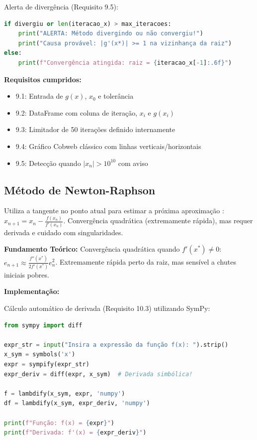 \documentclass[
	12pt,				%
	openright,			%
	oneside,			%
	a4paper,			%
	english,			%
	brazil				%
	]{abntex2}
\begin{document}
Alerta de divergência (Requisito 9.5):

\begin{lstlisting}[language=Python, caption={Requisito 9.5 - Alerta de Divergência}]
if divergiu or len(iteracao_x) > max_iteracoes:
    print("ALERTA: Método divergindo ou não convergiu!")
    print("Causa provável: |g'(x*)| >= 1 na vizinhança da raiz")
else:
    print(f"Convergência atingida: raiz = {iteracao_x[-1]:.6f}")
\end{lstlisting}

\vspace{0.3cm}

\textbf{Requisitos cumpridos:}
\begin{itemize}
    \item[✓] 9.1: Entrada de $g(x)$, $x_0$ e tolerância
    \item[✓] 9.2: DataFrame com coluna de iteração, $x_i$ e $g(x_i)$
    \item[✓] 9.3: Limitador de 50 iterações definido internamente
    \item[✓] 9.4: Gráfico Cobweb clássico com linhas verticais/horizontais
    \item[✓] 9.5: Detecção quando $|x_n| > 10^{10}$ com aviso
\end{itemize}

\subsection{Método de Newton-Raphson}

Utiliza a tangente no ponto atual para estimar a próxima aproximação \cite{burden2015}: $x_{n+1} = x_n - \frac{f(x_n)}{f'(x_n)}$. Convergência quadrática (extremamente rápida), mas requer derivada e cuidado com singularidades.

\textbf{Fundamento Teórico:}
Convergência quadrática quando $f'(x^*) \neq 0$: $e_{n+1} \approx \frac{f''(x^*)}{2f'(x^*)} e_n^2$. Extremamente rápida perto da raiz, mas sensível a chutes iniciais pobres.

\vspace{0.3cm}

\textbf{Implementação:}

Cálculo automático de derivada (Requisito 10.3) utilizando SymPy:

\begin{lstlisting}[language=Python, caption={Requisito 10.3 - Cálculo Automático de Derivada}]
from sympy import diff

expr_str = input("Insira a expressão da função f(x): ").strip()
x_sym = symbols('x')
expr = sympify(expr_str)
expr_deriv = diff(expr, x_sym)  # Derivada simbólica!

f = lambdify(x_sym, expr, 'numpy')
df = lambdify(x_sym, expr_deriv, 'numpy')

print(f"Função: f(x) = {expr}")
print(f"Derivada: f'(x) = {expr_deriv}")
\end{lstlisting}
\end{document}

